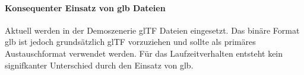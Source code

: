 \paragraph{Konsequenter Einsatz von glb Dateien}

Aktuell werden in der Demoszenerie glTF Dateien eingesetzt. Das binäre Format glb ist jedoch grundsätzlich glTF vorzuziehen und sollte als primäres Austauschformat verwendet werden. Für das Laufzeitverhalten entsteht kein signifkanter Unterschied durch den Einsatz von glb.